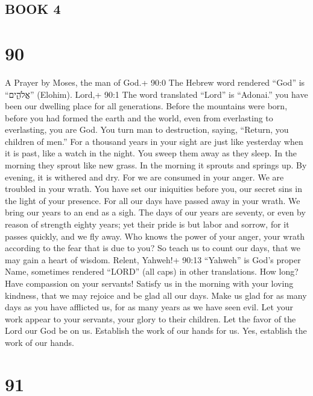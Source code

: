 \hypertarget{book-4}{%
\subsection{BOOK 4}\label{book-4}}

\hypertarget{section-80}{%
\section{90}\label{section-80}}

A Prayer by Moses, the man of God.+ 90:0 The Hebrew word rendered
``God'' is ``אֱלֹהִ֑ים'' (Elohim).  Lord,+ 90:1 The word
translated ``Lord'' is ``Adonai.'' you have been our dwelling place for
all generations.  Before the mountains were born, before you
had formed the earth and the world, even from everlasting to
everlasting, you are God.  You turn man to destruction,
saying, ``Return, you children of men.''  For a thousand
years in your sight are just like yesterday when it is past, like a
watch in the night.  You sweep them away as they sleep. In
the morning they sprout like new grass.  In the morning it
sprouts and springs up. By evening, it is withered and dry. 
For we are consumed in your anger. We are troubled in your wrath.
 You have set our iniquities before you, our secret sins in
the light of your presence.  For all our days have passed
away in your wrath. We bring our years to an end as a sigh.
 The days of our years are seventy, or even by reason of
strength eighty years; yet their pride is but labor and sorrow, for it
passes quickly, and we fly away.  Who knows the power of
your anger, your wrath according to the fear that is due to you?
 So teach us to count our days, that we may gain a heart of
wisdom.  Relent, Yahweh!+ 90:13 ``Yahweh'' is God's proper
Name, sometimes rendered ``LORD'' (all caps) in other translations. How
long? Have compassion on your servants!  Satisfy us in the
morning with your loving kindness, that we may rejoice and be glad all
our days.  Make us glad for as many days as you have
afflicted us, for as many years as we have seen evil.  Let
your work appear to your servants, your glory to their children.
 Let the favor of the Lord our God be on us. Establish the
work of our hands for us. Yes, establish the work of our hands.

\hypertarget{section-81}{%
\section{91}\label{section-81}}

